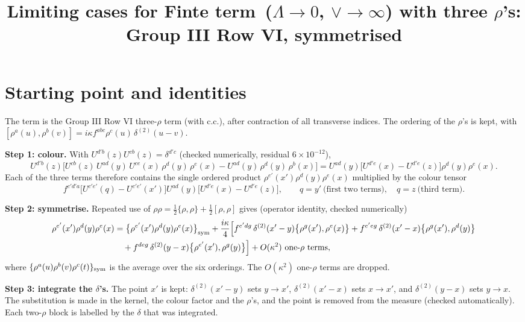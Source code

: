 \documentclass[9pt]{article}
\title{Limiting cases for Finte term\, ($\Lambda\to 0$, $\vee\to \infty$) with three $\rho$'s: Group III Row VI, symmetrised}
\author{}
\date{}
\numberwithin{equation}{section}
\begin{document}
\maketitle
\section{Starting point and identities}
The term is the Group III Row VI three-$\rho$ term (with c.c.), after contraction of all transverse indices. The ordering of the $\rho$'s is kept, with $[\rho^{a}(u),\rho^{b}(v)]=i\kappa f^{abc}\rho^{c}(u)\,\delta^{(2)}(u-v)$.

\noindent\textbf{Step 1: colour.} With $U^{d'b}(z)U^{cb}(z)=\delta^{d'c}$ (checked numerically, residual $6\times10^{-12}$),
\begin{equation}
U^{d'b}(z)\Big[U^{cb}(z)\,U^{ad}(y)\,U^{ce}(x)\,\rho^{d}(y)\,\rho^{e}(x)-U^{ad}(y)\,\rho^{d}(y)\,\rho^{b}(x)\Big]=U^{ad}(y)\Big[U^{d'e}(x)-U^{d'e}(z)\Big]\rho^{d}(y)\rho^{e}(x).
\end{equation}
Each of the three terms therefore contains the single ordered product $\rho^{e'}(x')\rho^{d}(y)\rho^{e}(x)$ multiplied by the colour tensor
\begin{equation}
f^{c'd'a}\Big[U^{c'e'}(q)-U^{c'e'}(x')\Big]U^{ad}(y)\Big[U^{d'e}(x)-U^{d'e}(z)\Big],\qquad q=y'\ \text{(first two terms)},\quad q=z\ \text{(third term)}.
\end{equation}

\noindent\textbf{Step 2: symmetrise.} Repeated use of $\rho\rho=\frac12\{\rho,\rho\}+\frac12[\rho,\rho]$ gives (operator identity, checked numerically)
\begin{align}
\rho^{e'}(x')\rho^{d}(y)\rho^{e}(x)&=\big\{\rho^{e'}(x')\rho^{d}(y)\rho^{e}(x)\big\}_{\rm sym}+\frac{i\kappa}{4}\Big[f^{e'dg}\,\delta^{(2)}(x'-y)\big\{\rho^{g}(x'),\rho^{e}(x)\big\}+f^{e'eg}\,\delta^{(2)}(x'-x)\big\{\rho^{g}(x'),\rho^{d}(y)\big\}\notag\\
&\quad+f^{deg}\,\delta^{(2)}(y-x)\big\{\rho^{e'}(x'),\rho^{g}(y)\big\}\Big]+O(\kappa^{2})\ \text{one-}\rho\ \text{terms},
\end{align}
where $\{\rho^{a}(u)\rho^{b}(v)\rho^{c}(t)\}_{\rm sym}$ is the average over the six orderings. The $O(\kappa^{2})$ one-$\rho$ terms are dropped.

\noindent\textbf{Step 3: integrate the $\delta$'s.} The point $x'$ is kept: $\delta^{(2)}(x'-y)$ sets $y\to x'$, $\delta^{(2)}(x'-x)$ sets $x\to x'$, and $\delta^{(2)}(y-x)$ sets $y\to x$. The substitution is made in the kernel, the colour factor and the $\rho$'s, and the point is removed from the measure (checked automatically). Each two-$\rho$ block is labelled by the $\delta$ that was integrated.
\end{document}

